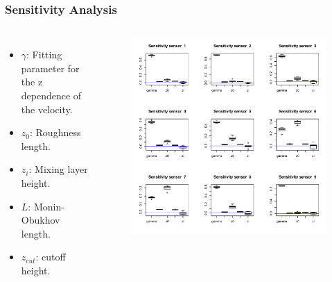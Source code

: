 \documentclass[11pt]{beamer}
\theoremstyle{plain}
\theoremstyle{definition}
\newcommand\ChangeFont{\fontsize{9}{7.2}\selectfont}
\begin{document}
\begin{frame}
\frametitle{Sensitivity Analysis}
\begin{columns}[c]
\ChangeFont
\begin{itemize}
\item $\gamma$: Fitting parameter for the z dependence of the velocity.
\item $z_{0}$: Roughness length.
\item $z_{i}$: Mixing layer height.
\item $L$: Monin-Obukhov length.
\item $z_{cut}$: cutoff height.
\end{itemize}

\column{2.5in}
\begin{figure}
\includegraphics[scale=0.35]{../FigChap4/sensitivityPlot.pdf}
\end{figure}
\end{columns}

\end{frame}
\end{document}
